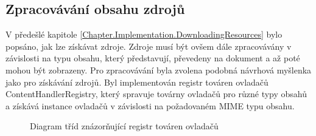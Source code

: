\subsection{Zpracovávání obsahu zdrojů}
\label{Chapter.Implementation.ContentHandling}

V předešlé kapitole \ref{Chapter.Implementation.DownloadingResources} bylo popsáno, jak lze získávat zdroje. Zdroje musí být
ovšem dále zpracovávány v závislosti na typu obsahu, který představují, převedeny na dokument a až poté mohou být zobrazeny. Pro zpracovávání byla zvolena podobná návrhová myšlenka jako pro získávání zdrojů. Byl implementován registr továren ovladačů ContentHandlerRegistry, který spravuje továrny ovladačů pro různé typy obsahů a získává instance ovladačů v závislosti na požadovaném MIME typu obsahu.

\begin{figure}[H]
  \begin{center}
    \caption{Diagram tříd znázorňující registr továren ovladačů}
    \label{Figure.ContentHandlerRegistry}
  \end{center}
\end{figure}


